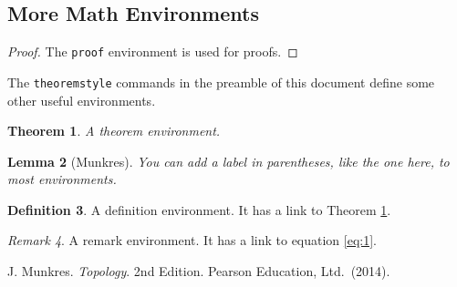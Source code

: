 \documentclass[a4paper,10pt,leqno]{article}
\numberwithin{equation}{section}
\theoremstyle{plain}
\newtheorem{thm}{Theorem}[section]
\newtheorem{lem}[thm]{Lemma}
\theoremstyle{definition}
\newtheorem{df}[thm]{Definition}
\theoremstyle{remark}
\newtheorem{rem}[thm]{Remark}
\begin{document}
\subsection{More Math Environments} 

\begin{proof} 
The \texttt{proof} environment is used for proofs.
\end{proof} 

The \texttt{theoremstyle} commands in the preamble of this document define some other useful environments.

\begin{thm}\label{thm:1}
A theorem environment.
\end{thm}

\begin{lem}[Munkres]
You can add a label in parentheses, like the one here, to most environments.
\end{lem}

\begin{df}
A definition environment.
It has a link to Theorem \ref{thm:1}.
\end{df}

\begin{rem}
A remark environment.
It has a link to equation \eqref{eq:1}.
\end{rem}

\frenchspacing
\begin{thebibliography}{11}
	J. Munkres.
	\textsl{Topology}.
	2nd Edition.
	Pearson Education, Ltd.\ (2014).
	
	
\end{thebibliography}
\end{document}
